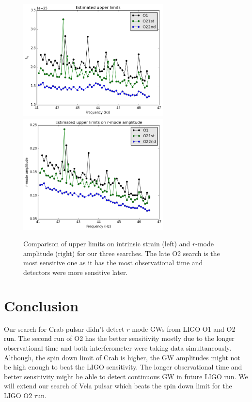 \documentclass{ttuthes2007}
\begin{document}
\begin{figure}[h!] 
\includegraphics[width=3in]{figure/Crabupper.png}
\includegraphics[width=3in]{figure/modeamplitude.png}

\caption{Comparison of upper limits on intrinsic strain (left) and $r$-mode
amplitude (right) for our three searches. The late O2 search is the most
sensitive one as it has the most observational
time and detectors were more sensitive later.} 
\label{fig:UL}
\end{figure}

\section{Conclusion} 

Our search for Crab pulsar didn't detect $r$-mode \acp{GW} from \ac{LIGO}
\ac{O1} and \ac{O2} run. The second run of \ac{O2} has the better sensitivity
mostly due to the longer observational time and both interferometer were taking
data simultaneously. Although, the spin down limit of Crab is higher, the \ac{GW}
amplitudes might not be high enough to beat the LIGO sensitivity. The longer
observational time and better sensitivity might be able to detect continuous
\ac{GW} in future LIGO run.  We will extend our search of Vela pulsar which
beats the spin down limit for the LIGO \ac{O2} run.  
\end{document}
